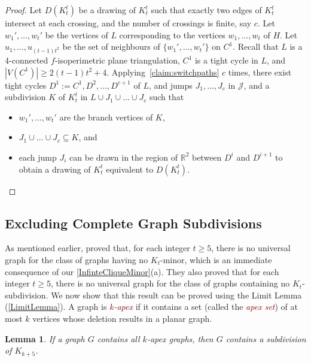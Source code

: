 \documentclass[a4paper,11pt]{article}
\makeatletter
\newcommand{\defn}[1]{\textcolor{Maroon}{\emph{#1}}\index{#1}}
\newcommand{\hdefn}[2]{\textcolor{Maroon}{\emph{#1-#2}}\index{#2@#1-#2}}
\theoremstyle{plain}
\newtheorem{lem}[thm]{Lemma}
\theoremstyle{definition}
\renewcommand{\geq}{\geqslant}
\newcommand{\JJ}{\mathcal{J}}
\makeatother
\begin{document}
\begin{proof}
Let $D(K_t^t)$ be a drawing of $K_t^t$ such that exactly two edges of $K_t^t$ intersect at each crossing, and the number of crossings is finite, say $c$. Let $w_1', \dots, w_t'$ be the vertices of $L$ corresponding to the vertices $w_1, \dots, w_t$ of $H$.  Let $u_1, \dots, u_{(t-1)t^2}$ be the set of neighbours of $\{w_1', \dots, w_t'\}$ on $C^1$.  Recall that $L$ is a 4-connected $f$-isoperimetric plane triangulation, $C^1$ is a tight cycle in $L$, and $|V(C^1)| \geq 2(t-1)t^2+4$. Applying~\cref{claim:switchpaths} $c$ times, there exist tight cycles $D^1:=C^1, D^2, \dots , D^{c+1}$ of $L$, and jumps $J_1, \dots, J_c$ in $\JJ$, and a subdivision $K$  of $K_t^t$ in $L \cup J_1 \cup \dots \cup J_c$ such that 
\begin{itemize}
    \item $w_1', \dots, w_t'$ are the branch vertices of $K$,
    \item $J_1 \cup \dots  \cup J_c \subseteq K$, and
    \item each jump $J_i$ can be drawn in the region of $\mathbb{R}^2$ between $D^i$ and $D^{i+1}$ to obtain a drawing of $K_t^t$ equivalent to $D(K_t^t)$. \qedhere
\end{itemize}
\end{proof}

\subsection{Excluding Complete Graph Subdivisions}
\label{ExcludingSubdivision}

As mentioned earlier, \citet{DHV85} proved that, for each integer $t\geq 5$, there is no universal graph for the class of graphs having no $K_t$-minor, which is an immediate consequence of our \cref{InfinteCliqueMinor}(a). They also proved that for each integer $t\geq 5$, there is no universal graph for the class of graphs containing no $K_t$-subdivision. We now show that this result can be proved using the Limit Lemma (\cref{LimitLemma}). A graph is \hdefn{$k$}{apex} if it contains a set (called the \defn{apex set}) of at most $k$ vertices whose deletion results in a planar graph. 

\begin{lem}
\label{Apex}
If a graph $G$ contains all $k$-apex graphs, then $G$ contains a subdivision of $K_{k+5}$. 
\end{lem}
\end{document}
